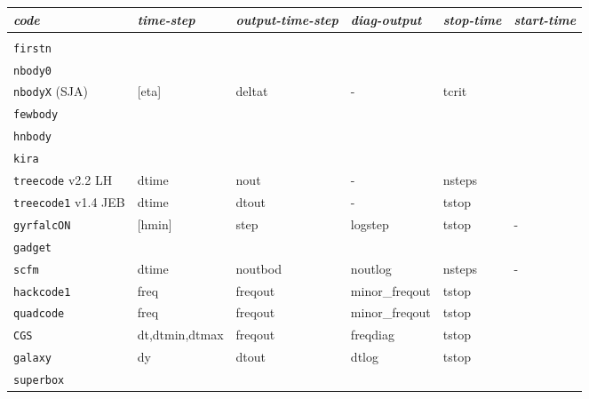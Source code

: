\begin{itemize}
\begin{itemize}
\begin{center}
\begin{table}[h]
\begin{tabular}{||l|l|l|l|l|l||}
\hline 
{\it code} & {\it time-step}  & {\it output-time-step}  & {\it diag-output} & {\it stop-time} & {\it start-time} \\

\hline &&&&& \\

{\tt firstn}         & & & & & \\

{\tt nbody0}         & & & & & \\

{\tt nbodyX}  (SJA)  & [eta] & deltat & - & tcrit & \\

{\tt fewbody}        &  & & & & \\

{\tt hnbody}         &  & & & & \\

{\tt kira}           &  & & & & \\

{\tt treecode} v2.2 LH      & dtime & nout & - & nsteps &  \\
{\tt treecode1} v1.4 JEB    & dtime & dtout & - & tstop &  \\

{\tt gyrfalcON}      & [hmin] & step & logstep & tstop & - \\

{\tt gadget}         &  & & & & \\

{\tt scfm}           & dtime & noutbod & noutlog & nsteps & - \\


{\tt hackcode1}      & freq & freqout & minor\_freqout & tstop & \\
{\tt quadcode}       & freq & freqout & minor\_freqout & tstop & \\


{\tt CGS}            & dt,dtmin,dtmax & freqout & freqdiag & tstop & \\

{\tt galaxy}         & dy & dtout & dtlog & tstop & \\

{\tt superbox}       & & & & & \\

\hline 

\end{tabular}
\label{t:codekeys}
\end{table}
\end{center}



\end{itemize}
\end{itemize}
